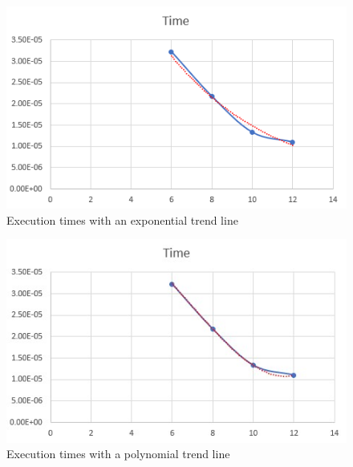 \documentclass[a4paper,12pt]{article}
\begin{document}
\begin{figure}[H]
    \centering
    \includegraphics[scale = 0.7]{images/image_2022-06-14_135506513.png}
    \caption{Execution times with an exponential trend line}
    \label{fig:exptrend}
\end{figure}


\begin{figure}[H]
    \centering
    \includegraphics{images/poltrendline.jpg}
    \caption{Execution times with a polynomial trend line}
    \label{fig:poltrend}
\end{figure}
\end{document}
